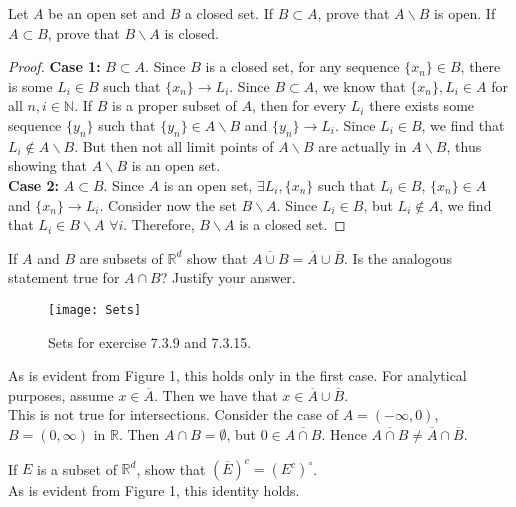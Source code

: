 \documentclass[12pt]{book}
\newcommand{\N}{\mathbb{N}}
\newcommand{\R}{\mathbb{R}}
\newenvironment{exercise}[2][Exercise]{\begin{trivlist}
\item[\hskip \labelsep {\bfseries #1}\hskip \labelsep {\bfseries #2.}]}{\end{trivlist}}
\begin{document}
\begin{exercise}{7.3.6}
Let $A$ be an open set and $B$ a closed set. If $B \subset A$, prove that $A \backslash B$ is
open. If $A \subset B$, prove that $B \backslash A$ is closed.

\begin{proof}
    \textbf{Case 1:} $B\subset A$. Since $B$ is a closed set, for any sequence $\{x_n\} \in B$, there is some $L_i \in B$ such that $\{x_n\} \to L_i$. Since $B \subset A$, we know that $\{x_n\}, L_i \in A$ for all $n,i \in \N$. If $B$ is a proper subset of $A$, then for every $L_i$ there exists some sequence $\{y_n\}$ such that $\{y_n\} \in A\backslash B$ and $\{y_n\} \to L_i$. Since $L_i \in B$, we find that $L_i \notin A\backslash B$. But then not all limit points of $A \backslash B$ are actually in $A \backslash B$, thus showing that $A \backslash B$ is an open set. \\
    \textbf{Case 2:} $A \subset B$. Since $A$ is an open set, $\exists L_i, \{x_n\}$ such that $L_i \in B$, $\{x_n\} \in A$ and $\{x_n\} \to L_i$. Consider now the set $B \backslash A$. Since $L_i \in B$, but $L_i \notin A$, we find that $L_i \in B \backslash A  \, \, \forall i$. Therefore, $B \backslash A$ is a closed set.
\end{proof}
\end{exercise}


\begin{exercise}{7.3.9}
If $A$ and $B$ are subsets of $\R^d$ show that $\overline{A \cup B} = \overline{A} \cup \overline{B}$. Is the analogous statement true for $A \cap B$? Justify your answer. \\

\begin{figure}[h!]
  \centering
    \texttt{[image: Sets]}
  \caption{Sets for exercise 7.3.9 and 7.3.15.}
\end{figure}

As is evident from Figure 1, this holds only in the first case. For analytical purposes, assume $x \in \overline{A}$. Then we have that $x \in \overline{A} \cup \overline{B}$. \\
This is not true for intersections. Consider the case of $A= (-\infty, 0)$, $B= (0, \infty)$ in $\R$. Then $A \cap B = \emptyset$, but  $0 \in \overline{A \cap B}$. Hence $\overline{A \cap B} \neq \overline{A} \cap \overline{B}$.
\end{exercise}


\begin{exercise}{7.3.15}
If $E$ is a subset of $\R^d$, show that $(\overline{E})^c = (E^c)^\circ$. \\

As is evident from Figure 1, this identity holds.
\end{exercise}
\end{document}
